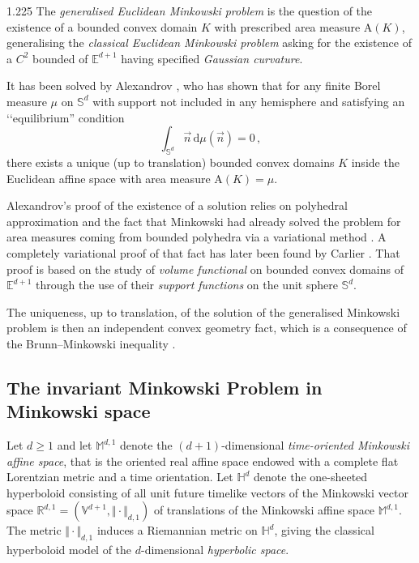 \documentclass[reqno, a4paper]{amsart}
\numberwithin{equation}{section}
\numberwithin{figure}{section}
\theoremstyle{definition}
\theoremstyle{remark}
\newcommand{\R}{\mathbb{R}} %
\newcommand{\V}{\mathbb{V}} %
\newcommand{\E}{\mathbb{E}} %
\newcommand{\Sph}{\mathbb{S}} %
\newcommand{\M}{\mathbb{M}} %
\renewcommand{\H}{\mathbb{H}} %
\newcommand{\dif}{\mathrm{d}} %
\newcommand{\Area}{\mathrm{A}} %
\begin{document}
\begin{spacing}{1.225}
The \emph{generalised Euclidean Minkowski problem} is the question of the existence of a bounded convex domain $K$ with prescribed area measure $\Area(K)$, generalising the \emph{classical Euclidean Minkowski problem} \cite{Minkowski_03} asking for the existence of a $C^2$ bounded of $\E^{d+1}$ having specified \emph{Gaussian curvature}.

It has been solved by Alexandrov \cite{Alexandrov_38}, who has shown that for any finite Borel measure $\mu$ on $\Sph^d$ with support not included in any hemisphere and satisfying an ‘‘equilibrium'' condition 
\begin{equation}\label{equilibirum}\tag{Eq}
    \int_{\Sph^d}\vec{n} \, \dif\mu(\vec{n})=0 \, ,
\end{equation}
there exists a unique (up to translation) bounded convex domains $K$ inside the Euclidean affine space with area measure $\Area(K)=\mu$. 

Alexandrov's proof of the existence of a solution relies on polyhedral approximation and the fact that Minkowski had already solved the problem for area measures coming from bounded polyhedra via a variational method \cite{Minkowski_97}. A completely variational proof of that fact has later been found by Carlier \cite{Carlier_03}. That proof is based on the study of \emph{volume functional} on bounded convex domains of $\E^{d+1}$ through the use of their \emph{support functions} on the unit sphere $\Sph^{d}$.

The uniqueness, up to translation, of the solution of the generalised Minkowski problem is then an independent convex geometry fact, which is a consequence of the Brunn--Minkowski inequality \cite[Theorem~8.1.1]{Schneider_93}.

\subsection*{The invariant Minkowski Problem in Minkowski space}

Let $d \geq 1$ and let $\M^{d,1}$ denote the $(d + 1)$-dimensional \emph{time-oriented Minkowski affine space}, that is the oriented real affine space endowed with a complete flat Lorentzian metric and a time orientation. Let $\H^d$ denote the one-sheeted hyperboloid consisting of all unit future timelike vectors of the Minkowski vector space $\R^{d,1} =(\V^{d+1}, \Vert\cdot\Vert_{d,1})$ of translations of the Minkowski affine space $\M^{d,1}$. The metric $\Vert\cdot\Vert_{d,1}$ induces a Riemannian metric on $\H^{d}$, giving the classical hyperboloid model of the $d$-dimensional \emph{hyperbolic space}.


\end{spacing}
\end{document}
